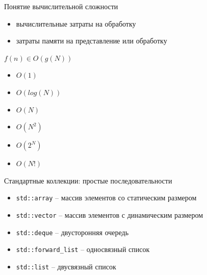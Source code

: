 \documentclass[unknownkeysallowed,xcolor=table]{beamer}
\begin{document}
\begin{frame}{Понятие вычислительной сложности}

\begin{itemize}
  \item вычислительные затраты на обработку \vspace{0.5em}
  \item затраты памяти на представление или обработку
\end{itemize}

\vspace{1em}

\begin{center}
$f(n) \in O(g(N))$
\end{center}

\vspace{0.5em}

\begin{itemize}
  \item $O(1)$
  \item $O(log(N))$
  \item $O(N)$
  \item $O(N^2)$
  \item $O(2^N)$
  \item $O(N!)$
\end{itemize}

\end{frame}

\begin{frame}[fragile]{Стандартные коллекции: простые последовательности}

\begin{itemize}
  \item \lstinline{std::array} -- массив элементов со статическим размером \vspace{0.7em}
  \item \lstinline{std::vector} -- массив элементов с динамическим размером \vspace{0.7em}
  \item \lstinline{std::deque} -- двусторонняя очередь \vspace{0.7em}
  \item \lstinline{std::forward_list} -- односвязный список \vspace{0.7em}
  \item \lstinline{std::list} -- двусвязный список
\end{itemize}

\end{frame}
\end{document}
